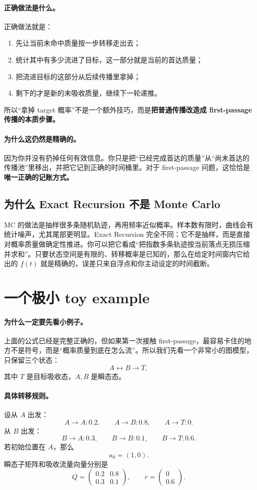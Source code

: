 \documentclass[11pt,fontset=fandol]{ctexart}
\begin{document}
\paragraph{正确做法是什么。}
正确做法就是：
\begin{enumerate}
  \item 先让当前未命中质量按一步转移走出去；
  \item 统计其中有多少流进了目标，这一部分就是当前的首达质量；
  \item 把流进目标的这部分从后续传播里拿掉；
  \item 剩下的才是新的未吸收质量，继续下一轮递推。
\end{enumerate}
所以“拿掉 target 概率”不是一个额外技巧，而是\textbf{把普通传播改造成 first-passage 传播的本质步骤。}

\paragraph{为什么这仍然是精确的。}
因为你并没有扔掉任何有效信息。你只是把“已经完成首达的质量”从“尚未首达的传播池”里移出，并把它记到正确的时间桶里。对于 first-passage 问题，这恰恰是\textbf{唯一正确的记账方式。}

\subsection*{为什么 Exact Recursion 不是 Monte Carlo}
MC 的做法是抽样很多条随机轨迹，再用频率近似概率。样本数有限时，曲线会有统计噪声，尤其尾部更明显。Exact Recursion 完全不同：它不是抽样，而是直接对概率质量做确定性推进。你可以把它看成“把指数多条轨迹按当前落点无损压缩并求和”。只要状态空间是有限的、转移概率是已知的，那么在给定时间窗内它给出的 $f(t)$ 就是精确的，误差只来自浮点和你主动设定的时间截断。

\section{一个极小 toy example}
\paragraph{为什么一定要先看小例子。}
上面的公式已经是完整正确的，但如果第一次接触 first-passage，最容易卡住的地方不是符号，而是“概率质量到底在怎么流”。所以我们先看一个非常小的图模型，只保留三个状态：
\[
  A \longleftrightarrow B \longrightarrow T,
\]
其中 $T$ 是目标吸收态，$A,B$ 是瞬态态。

\paragraph{具体转移规则。}
设从 $A$ 出发：
\[
  A\to A:0.2,\qquad A\to B:0.8,\qquad A\to T:0.
\]
从 $B$ 出发：
\[
  B\to A:0.3,\qquad B\to B:0.1,\qquad B\to T:0.6.
\]
若初始位置在 $A$，那么
\[
  u_0=(1,0).
\]
瞬态子矩阵和吸收流量向量分别是
\[
  Q=
  \begin{pmatrix}
    0.2 & 0.8\\
    0.3 & 0.1
  \end{pmatrix},
  \qquad
  r=
  \begin{pmatrix}
    0\\
    0.6
  \end{pmatrix}.
\]
\end{document}
